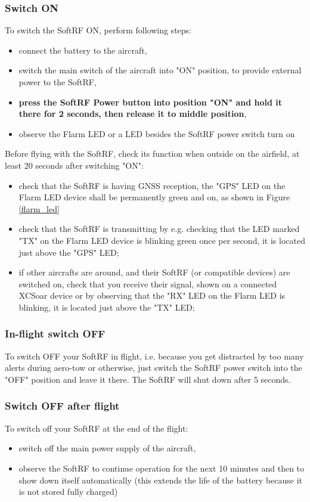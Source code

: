 \documentclass[11pt,a4paper]{article}
\begin{document}
\subsubsection{Switch ON}\label{power_on}
To switch the SoftRF ON, perform following steps:

\begin{itemize}
\item connect the battery to the aircraft, 
\item switch the main switch of the aircraft into "ON" position, to provide external power to the SoftRF,
\item {\bf press the SoftRF Power button into position "ON" and hold it there for 2 seconds, then release it to middle position},
\item observe the Flarm LED or a LED besides the SoftRF power switch turn on
\end{itemize}

Before flying with the SoftRF, check its function when outside on the airfield, at least 20 seconds after switching "ON":
\begin{itemize}
\item check that the SoftRF is having GNSS reception, the "GPS" LED on the Flarm LED device shall be permanently green and on, as shown in Figure \ref{flarm_led}
\item check that the SoftRF is transmitting by e.g. checking that the LED marked "TX" on the Flarm LED device is blinking green once per second, it is located just above the "GPS" LED;
\item if other aircrafts are around, and their SoftRF (or compatible devices) are switched on, check that you receive their signal, shown on a connected XCSoar device or by observing that the "RX" LED on the Flarm LED is blinking, it is located just above the "TX" LED;
\end{itemize}

\subsubsection{In-flight switch OFF}
To switch OFF your SoftRF in flight, i.e. because you get distracted by too many alerts during aero-tow or otherwise, just switch the SoftRF power switch into the "OFF" position and leave it there. The SoftRF will shut down after 5 seconds.

\subsubsection{Switch OFF after flight}
To switch off your SoftRF at the end of the flight:
\begin{itemize}
\item switch off the main power supply of the aircraft,
\item observe the SoftRF to continue operation for the next 10 minutes and then to show down itself automatically (this extends the life of the battery because it is not stored fully charged)
\end{itemize} 
\end{document}

